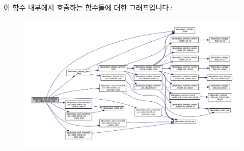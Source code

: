 이 함수 내부에서 호출하는 함수들에 대한 그래프입니다.\+:
\nopagebreak
\begin{figure}[H]
\begin{center}
\leavevmode
\includegraphics[width=350pt]{group__command__set__video__format_ga08501a4c0418146b71cf49e4d823eabc_cgraph}
\end{center}
\end{figure}


